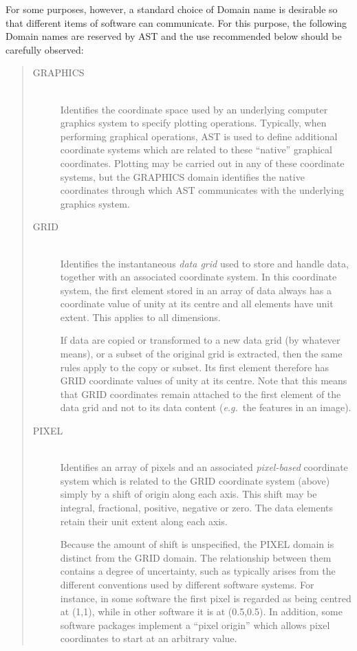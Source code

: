 \documentclass[twoside,11pt]{article}
\begin{document}
For some purposes, however, a standard choice of Domain name is
desirable so that different items of software can communicate. For
this purpose, the following Domain names are reserved by AST and the
use recommended below should be carefully observed:

\begin{quote}
\begin{description}
\item[GRAPHICS]\mbox{}\\
Identifies the coordinate space used by an underlying computer
graphics system to specify plotting operations. Typically, when
performing graphical operations, AST is used to define additional
coordinate systems which are related to these ``native'' graphical
coordinates.  Plotting may be carried out in any of these coordinate
systems, but the GRAPHICS domain identifies the native coordinates
through which AST communicates with the underlying graphics system.

\item[GRID]\mbox{}\\
Identifies the instantaneous {\em{data grid}} used to store and handle
data, together with an associated coordinate system. In this
coordinate system, the first element stored in an array of data always
has a coordinate value of unity at its centre and all elements have
unit extent. This applies to all dimensions.

If data are copied or transformed to a new data grid (by whatever
means), or a subset of the original grid is extracted, then the same
rules apply to the copy or subset. Its first element therefore has
GRID coordinate values of unity at its centre. Note that this means
that GRID coordinates remain attached to the first element of the data
grid and not to its data content ({\em{e.g.}}\ the features in an
image).

\item[PIXEL]\mbox{}\\
Identifies an array of pixels and an associated {\em{pixel-based}}
coordinate system which is related to the GRID coordinate system
(above) simply by a shift of origin along each axis. This shift may be
integral, fractional, positive, negative or zero. The data elements
retain their unit extent along each axis.

Because the amount of shift is unspecified, the PIXEL domain is
distinct from the GRID domain. The relationship between them contains
a degree of uncertainty, such as typically arises from the different
conventions used by different software systems. For instance, in some
software the first pixel is regarded as being centred at (1,1), while
in other software it is at (0.5,0.5). In addition, some software
packages implement a ``pixel origin'' which allows pixel coordinates
to start at an arbitrary value.


\end{description}
\end{quote}
\end{document}
